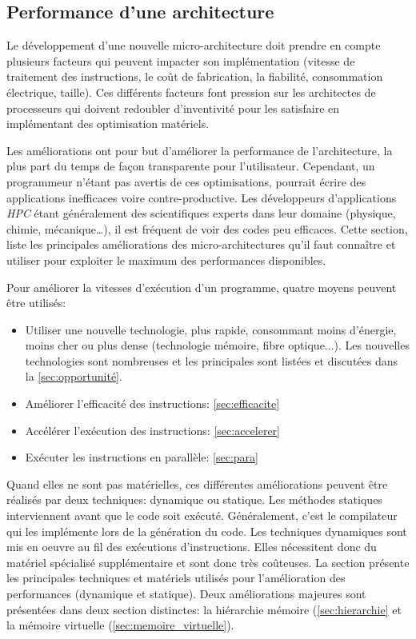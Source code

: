 \subsection{Performance d'une architecture}


Le développement d'une nouvelle micro-architecture doit prendre en compte plusieurs facteurs qui peuvent impacter son implémentation (vitesse de traitement des instructions, le coût de fabrication, la fiabilité, consommation électrique, taille). Ces différents facteurs font pression sur les architectes de processeurs qui doivent redoubler d'inventivité pour les satisfaire en implémentant des optimisation matériels.

Les améliorations ont pour but d'améliorer la performance de l'architecture, la plus part du temps de façon transparente pour l'utilisateur. Cependant, un programmeur n'étant pas avertis de ces optimisations, pourrait écrire des applications inefficaces voire contre-productive. Les développeurs d'applications \textit{HPC} étant généralement des scientifiques experts dans leur domaine (physique, chimie, mécanique…), il est fréquent de voir des codes peu efficaces. Cette section, liste les principales améliorations des micro-architectures qu'il faut connaître et utiliser pour exploiter le maximum des performances disponibles. 


Pour améliorer la vitesses d'exécution d'un programme, quatre moyens peuvent être utilisés:
\begin{itemize}
    \item Utiliser une nouvelle technologie, plus rapide, consommant moins d'énergie, moins cher ou plus dense (technologie mémoire, fibre optique...). Les nouvelles technologies sont nombreuses et les principales sont listées et discutées dans la \autoref{sec:opportunité}. 
    \item Améliorer l'efficacité des instructions: \autoref{sec:efficacite} 
    \item Accélérer l'exécution des instructions: \autoref{sec:accelerer}
    \item Exécuter les instructions en parallèle: \autoref{sec:para}
\end{itemize}

Quand elles ne sont pas matérielles, ces différentes améliorations peuvent être réalisés par deux techniques: dynamique ou statique. Les méthodes statiques interviennent avant que le code soit exécuté. Généralement, c'est le compilateur qui les implémente lors de la génération du code. Les techniques dynamiques sont mis en oeuvre au fil des exécutions d'instructions. Elles nécessitent donc du matériel spécialisé supplémentaire et sont donc très coûteuses. La section présente les principales techniques et matériels utilisés pour l'amélioration des performances (dynamique et statique). Deux améliorations majeures sont présentées dans deux section distinctes: la hiérarchie mémoire (\autoref{sec:hierarchie} et la mémoire virtuelle (\autoref{sec:memoire_virtuelle}).







